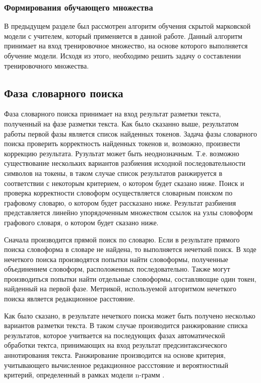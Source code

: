 \subsubsection{Формирования обучающего множества}
В предыдущем разделе был рассмотрен алгоритм обучения скрытой марковской модели с учителем, который применяется в данной работе. Данный алгоритм принимает на вход тренировочное множество, на основе которого выполняется обучение модели. Исходя из этого, необходимо решить задачу о составлении тренировочного множества.


\subsection{Фаза словарного поиска}
Фаза словарного поиска принимает на вход результат разметки текста, полученный на фазе разметки текста. Как было сказанно выше, результатом работы первой фазы является список найденных токенов. Задача фазы словарного поиска проверить корректность найденных токенов и, возможно, произвести коррекцию результата. Рузультат может быть неоднозначным. Т.е. возможно существование нескольких вариантов разбиения исходной последовательности символов на токены, в таком случае список результатов ранжируется в соответствии с некоторым критерием, о котором будет сказано ниже. Поиск и проверка корректности словоформ осуществляется словарным поиском по графовому словарю, о котором будет рассказано ниже. Результат разбиения представляется линейно упорядоченным множеством \cite{vereshagin_shen} ссылок на узлы словоформ графового словаря, о котором будет сказано ниже. 

Сначала производится прямой поиск по словарю. Если в результате прямого поиска словоформа в словаре не найдена, то выполняется нечеткий поиск. В ходе нечеткого поиска производятся попытки найти словоформы, полученные объединением словоформ, расположенных последовательно. Также могут производиться попытки найти отдельные словоформы, составляющие один токен, найденный на первой фазе. Метрикой, используемой алгоритмом нечеткого поиска является редакционное расстояние.

Как было сказано, в результате нечеткого поиска может быть получено несколько вариантов разметки текста. В таком случае производится ранжирование списка результатов, которое учитвается на последующих фазах автоматической обработки тектса, принимающих на вход результат предсинтаксического аннотирования текста. Ранжирование производится на основе критерия, учитывающего вычисленное редакционное рассстояние и вероятностный критерий, определенный в рамках модели n-грамм \cite{probling}.

